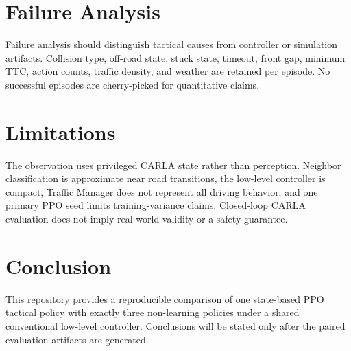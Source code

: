 \documentclass[10pt]{article}
\begin{document}
\section{Failure Analysis}
Failure analysis should distinguish tactical causes from controller or
simulation artifacts. Collision type, off-road state, stuck state, timeout,
front gap, minimum TTC, action counts, traffic density, and weather are retained
per episode. No successful episodes are cherry-picked for quantitative claims.

\section{Limitations}
The observation uses privileged CARLA state rather than perception. Neighbor
classification is approximate near road transitions, the low-level controller
is compact, Traffic Manager does not represent all driving behavior, and one
primary PPO seed limits training-variance claims. Closed-loop CARLA evaluation
does not imply real-world validity or a safety guarantee.

\section{Conclusion}
This repository provides a reproducible comparison of one state-based PPO
tactical policy with exactly three non-learning policies under a shared
conventional low-level controller. Conclusions will be stated only after the
paired evaluation artifacts are generated.
\end{document}
